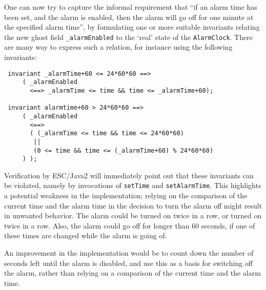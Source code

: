 \documentclass{llncs}
\begin{document}
% 

One can now try to capture the informal requirement that ``if an alarm time
has been set, and the alarm is enabled, then the alarm will go off for
one minute at the specified alarm time'', by formulating one or more
suitable invariants relating the new ghost field \texttt{\_alarmEnabled} to
the `real' state of the \texttt{AlarmClock}. There are many way to express
such a relation, for instance using the following invariants:
\begin{verbatim}
 invariant _alarmTime+60 <= 24*60*60 ==> 
     ( _alarmEnabled 
       <==> _alarmTime <= time && time <= _alarmTime+60);

 invariant alarmtime+60 > 24*60*60 ==> 
     ( _alarmEnabled 
       <==> 
       ( (_alarmTime <= time && time <= 24*60*60)
        ||
        (0 <= time && time <= (_alarmTime+60) % 24*60*60) 
     ) );
\end{verbatim}
Verification by ESC/Java2 will immediately point out that these invariants
can be violated,
namely by invocations of \texttt{setTime} and  \texttt{setAlarmTime}.
This highlights a potential weakness in the implementation;
relying on the comparison of the current time and the alarm time
in the decision to turn the alarm off might result in unwanted behavior. 
The alarm could be turned on twice in a row, or turned on twice in a row.
Also, the alarm could go off for longer than 60 seconds, if one of these times 
are changed while the alarm is going of.  


An improvement in the implementation would be to count down the number of 
seconds left until the alarm is disabled, and use this as a basis for switching 
off the alarm, rather than relying on a comparison of the current time 
and the alarm time.
\end{document}
